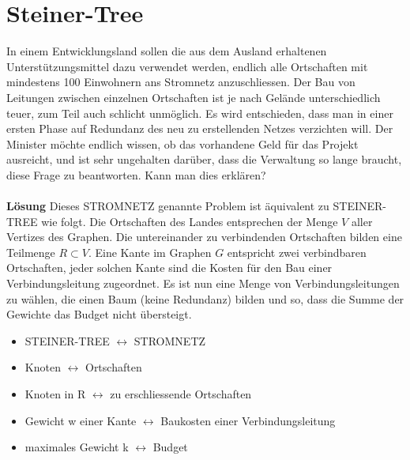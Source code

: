 \section{Steiner-Tree}
In einem Entwicklungsland sollen die aus dem Ausland erhaltenen Unterstützungsmittel dazu verwendet werden, endlich alle Ortschaften mit mindestens 100 Einwohnern ans Stromnetz anzuschliessen. Der Bau von Leitungen zwischen einzelnen Ortschaften ist je nach Gelände unterschiedlich teuer, zum Teil auch schlicht unmöglich. Es wird entschieden, dass man in einer ersten Phase auf Redundanz des neu zu erstellenden Netzes verzichten will. Der Minister möchte endlich wissen, ob das vorhandene Geld für das Projekt ausreicht, und ist sehr ungehalten darüber, dass die Verwaltung so lange braucht, diese Frage zu beantworten. Kann man dies erklären?\\
\\
\textbf{Lösung} Dieses STROMNETZ genannte Problem ist äquivalent zu STEINER-TREE wie folgt. Die Ortschaften des Landes entsprechen der Menge \textbf{$V$} aller Vertizes des Graphen. Die untereinander zu verbindenden Ortschaften bilden eine Teilmenge \textbf{$R \subset V$}. Eine Kante im Graphen \textbf{$G$} entspricht zwei verbindbaren Ortschaften, jeder solchen Kante sind die Kosten für den Bau einer Verbindungsleitung zugeordnet. Es ist nun eine Menge von Verbindungsleitungen zu wählen, die einen Baum (keine Redundanz) bilden und so, dass die Summe der Gewichte das Budget nicht übersteigt.
\begin{itemize}
\item STEINER-TREE $\leftrightarrow$ STROMNETZ
\item Knoten $\leftrightarrow$ Ortschaften
\item Knoten in R $\leftrightarrow$ zu erschliessende Ortschaften
\item Gewicht w einer Kante $\leftrightarrow$ Baukosten einer Verbindungsleitung
\item maximales Gewicht k $\leftrightarrow$ Budget
\end{itemize}

